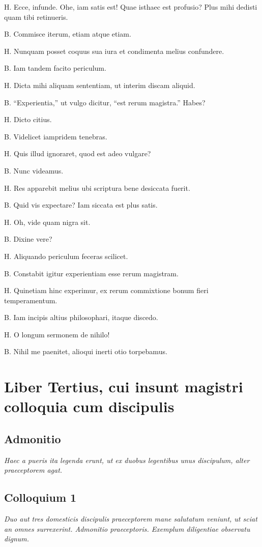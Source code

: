 \documentclass{article}
\begin{document}
H. Ecce, infunde. Ohe, iam satis est! Quae isthaec est profusio? Plus mihi dedisti quam tibi retinueris. 

B. Commisce iterum, etiam atque etiam. 

H. Nunquam posset coquus sua iura et condimenta melius confundere. 

B. Iam tandem facito periculum. 

H. Dicta mihi aliquam sententiam, ut interim discam aliquid. 

B. ``Experientia,'' ut vulgo dicitur, ``est rerum magistra.'' Habes?

H. Dicto citius. 

B. Videlicet iampridem tenebras. 

H. Quis illud ignoraret, quod est adeo vulgare?

B. Nunc videamus. 

H. Res apparebit melius ubi scriptura bene desiccata fuerit. 

B. Quid vis expectare? Iam siccata est plus satis. 

H. Oh, vide quam nigra sit. 

B. Dixine vere?

H. Aliquando periculum feceras scilicet. 

B. Constabit igitur experientiam esse rerum magistram. 

H. Quinetiam hinc experimur, ex rerum commixtione bonum fieri temperamentum. 

B. Iam incipis altius philosophari, itaque discedo. 

H. O longum sermonem de nihilo!

B. Nihil me paenitet, alioqui inerti otio torpebamus.

\section{Liber Tertius, cui insunt magistri colloquia cum discipulis} %
\subsection*{Admonitio}
\emph{Haec a pueris ita legenda erunt, ut ex duobus legentibus unus discipulum, alter praeceptorem agat.}

\subsection{Colloquium 1}
\emph{Duo aut tres domesticis discipulis praeceptorem mane salutatum veniunt, ut sciat an omnes surrexerint. Admonitio praeceptoris. Exemplum diligentiae observatu dignum.}
\end{document}
